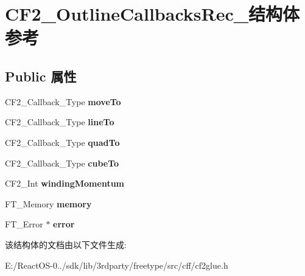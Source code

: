 \hypertarget{struct_c_f2___outline_callbacks_rec__}{}\section{C\+F2\+\_\+\+Outline\+Callbacks\+Rec\+\_\+结构体 参考}
\label{struct_c_f2___outline_callbacks_rec__}
\subsection*{Public 属性}
\begin{DoxyCompactItemize}
\item 
\mbox{\label{struct_c_f2___outline_callbacks_rec___a68e9aa3aadb2fdc6443aca436d81da76}} 
C\+F2\+\_\+\+Callback\+\_\+\+Type {\bfseries move\+To}
\item 
\mbox{\label{struct_c_f2___outline_callbacks_rec___ad2d791546ea3097d1e6805f6b4071491}} 
C\+F2\+\_\+\+Callback\+\_\+\+Type {\bfseries line\+To}
\item 
\mbox{\label{struct_c_f2___outline_callbacks_rec___aed59237e4c7f12ba2b433cf4ab22b53c}} 
C\+F2\+\_\+\+Callback\+\_\+\+Type {\bfseries quad\+To}
\item 
\mbox{\label{struct_c_f2___outline_callbacks_rec___a2705b35e074ba63e63d16204ce914b45}} 
C\+F2\+\_\+\+Callback\+\_\+\+Type {\bfseries cube\+To}
\item 
\mbox{\label{struct_c_f2___outline_callbacks_rec___a5fa7b7c0b5bf15a01118a52799b77008}} 
C\+F2\+\_\+\+Int {\bfseries winding\+Momentum}
\item 
\mbox{\label{struct_c_f2___outline_callbacks_rec___aa20064286aa1b4193c7a4c1ccbb2af41}} 
F\+T\+\_\+\+Memory {\bfseries memory}
\item 
\mbox{\label{struct_c_f2___outline_callbacks_rec___ad1760a05d54651976e7010506daf568c}} 
F\+T\+\_\+\+Error $\ast$ {\bfseries error}
\end{DoxyCompactItemize}


该结构体的文档由以下文件生成\+:\begin{DoxyCompactItemize}
\item 
E\+:/\+React\+O\+S-\/0../sdk/lib/3rdparty/freetype/src/cff/cf2glue.\+h\end{DoxyCompactItemize}

